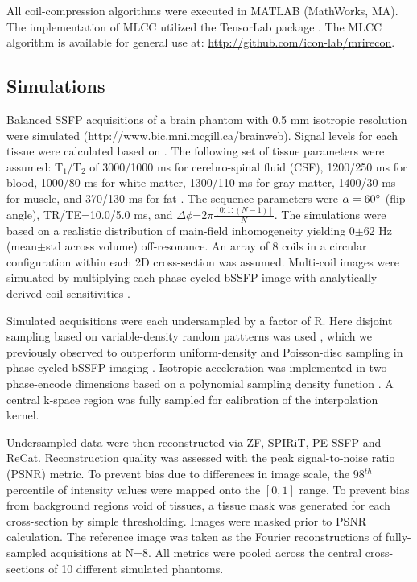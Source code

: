 \documentclass[11pt, onecolumn]{article}
\begin{document}
All coil-compression algorithms were executed in MATLAB (MathWorks, MA). The implementation of MLCC utilized the TensorLab package \cite{tensorlab3.0}. The MLCC algorithm is available for general use at: \url{http://github.com/icon-lab/mrirecon}.

\subsection*{Simulations}
Balanced SSFP acquisitions of a brain phantom with 0.5 mm isotropic resolution were simulated (http://www.bic.mni.mcgill.ca/brainweb). Signal levels for each tissue were calculated based on . The following set of tissue parameters were assumed: T$_1$/T$_2$ of 3000/1000 ms for cerebro-spinal fluid (CSF), 1200/250 ms for blood, 1000/80 ms for white matter, 1300/110 ms for gray matter, 1400/30 ms for muscle, and 370/130 ms for fat \cite{Ilicak:FJpKoYYb}. The sequence parameters were $\alpha=60\degree$ (flip angle), TR/TE=10.0/5.0 ms, and $\Delta\phi $=2$\pi \frac{[0:1:(N-1)]}{N}$. The simulations were based on a realistic distribution of main-field inhomogeneity yielding 0$\pm$62 Hz (mean$\pm$std across volume) off-resonance. An array of 8 coils in a circular configuration within each 2D cross-section was assumed. Multi-coil images were simulated by multiplying each phase-cycled bSSFP image with analytically-derived coil sensitivities \cite{Allison:2013ej}. 

Simulated acquisitions were each undersampled by a factor of R. Here disjoint sampling based on variable-density random pattterns was used \cite{Cukur:2015ic}, which we previously observed to outperform uniform-density and Poisson-disc sampling in phase-cycled bSSFP imaging \cite{Ilicak:FJpKoYYb}. Isotropic acceleration was implemented in two phase-encode dimensions based on a polynomial sampling density function \cite{MikiCS}. A central k-space region was fully sampled for calibration of the interpolation kernel. 

Undersampled data were then reconstructed via ZF, SPIRiT, PE-SSFP and ReCat. Reconstruction quality was assessed with the peak signal-to-noise ratio (PSNR) metric. To prevent bias due to differences in image scale, the 98$^{th}$ percentile of intensity values were mapped onto the $[0, 1]$ range. To prevent bias from background regions void of tissues, a tissue mask was generated for each cross-section by simple thresholding. Images were masked prior to PSNR calculation. The reference image was taken as the Fourier reconstructions of fully-sampled acquisitions at N=8. All metrics were pooled across the central cross-sections of 10 different simulated phantoms. %
\end{document}
